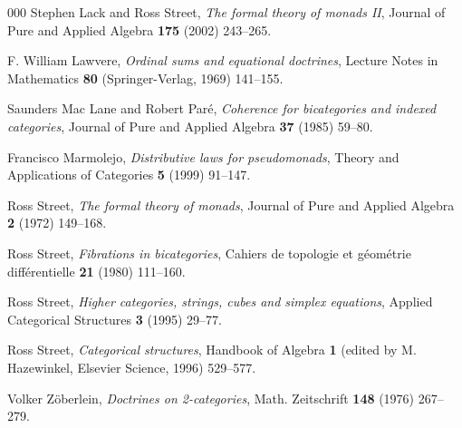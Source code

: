 \documentclass[a4paper,10pt]{article}
\numberwithin{equation}{section}
\begin{document}
\begin{thebibliography}{000}
 Stephen Lack and Ross Street, \textit{The formal theory of monads II}, Journal of Pure and Applied Algebra \textbf{175} (2002) 243--265.\label{FTMII} 

 F. William Lawvere, \textit{Ordinal sums and equational doctrines},  Lecture Notes in Mathematics \textbf{80} (Springer-Verlag, 1969) 141--155.\label{Law1969}

 Saunders Mac Lane and Robert Par\'e, \textit{Coherence for bicategories and indexed categories}, Journal of Pure and Applied Algebra \textbf{37} (1985) 59--80.\label{MacLPar}

 Francisco Marmolejo, \textit{Distributive laws for pseudomonads}, Theory and Applications of Categories \textbf{5} (1999) 91--147.\label{Marm}

 Ross Street, \textit{The formal theory of monads}, Journal of Pure and Applied Algebra \textbf{2} (1972) 149--168.\label{FTM} 

 Ross Street, \textit{Fibrations in bicategories}, Cahiers de topologie et g\'eom\'etrie diff\'erentielle \textbf{21} (1980) 111--160.\label{FiB}

 Ross Street, \textit{Higher categories, strings, cubes and simplex equations}, Applied Categorical Structures \textbf{3} (1995) 29--77.\label{HCSCSE}

 Ross Street, \textit{Categorical structures}, Handbook of Algebra \textbf{1} (edited by M. Hazewinkel, Elsevier Science, 1996) 529--577.\label{CatStr}

 Volker Z\"oberlein, \textit{Doctrines on 2-categories}, Math. Zeitschrift \textbf{148} (1976) 267--279. \label{Zoeb}

\end{thebibliography}
\end{document}
